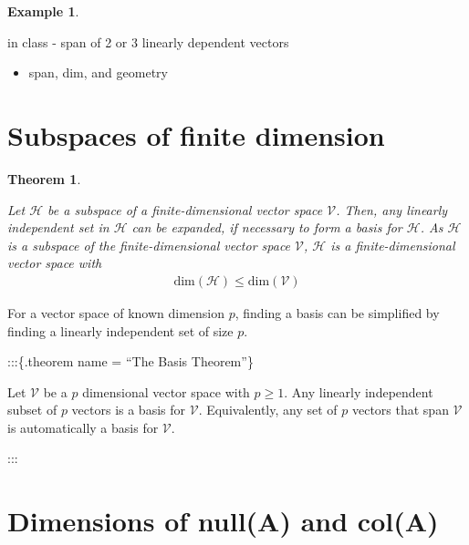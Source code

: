 \documentclass[
]{book}
\providecommand{\tightlist}{%
  \setlength{\itemsep}{0pt}\setlength{\parskip}{0pt}}
\newtheorem{theorem}{Theorem}[chapter]
\theoremstyle{definition}
\theoremstyle{definition}
\newtheorem{example}{Example}[chapter]
\theoremstyle{definition}
\theoremstyle{remark}
\begin{document}
\begin{example}
\protect\hypertarget{exm:unlabeled-div-148}{}\label{exm:unlabeled-div-148}

in class - span of 2 or 3 linearly dependent vectors

\begin{itemize}
\tightlist
\item
  span, dim, and geometry
\end{itemize}

\end{example}

\hypertarget{subspaces-of-finite-dimension}{%
\section{Subspaces of finite dimension}\label{subspaces-of-finite-dimension}}

\begin{theorem}
\protect\hypertarget{thm:unlabeled-div-149}{}\label{thm:unlabeled-div-149}

Let \(\mathcal{H}\) be a subspace of a finite-dimensional vector space \({\mathcal{V}}\). Then, any linearly independent set in \(\mathcal{H}\) can be expanded, if necessary to form a basis for \(\mathcal{H}\). As \(\mathcal{H}\) is a subspace of the finite-dimensional vector space \({\mathcal{V}}\), \(\mathcal{H}\) is a finite-dimensional vector space with
\[
\begin{aligned}
\mbox{dim}(\mathcal{H}) \leq \mbox{dim}(\mathcal{V})
\end{aligned}
\]

\end{theorem}

For a vector space of known dimension \(p\), finding a basis can be simplified by finding a linearly independent set of size \(p\).

:::\{.theorem name = ``The Basis Theorem''\}

Let \(\mathcal{V}\) be a \(p\) dimensional vector space with \(p \geq 1\). Any linearly independent subset of \(p\) vectors is a basis for \(\mathcal{V}\). Equivalently, any set of \(p\) vectors that span \({\mathcal{V}}\) is automatically a basis for \(\mathcal{V}\).

:::

\hypertarget{dimensions-of-nullmathbfa-and-colmathbfa}{%
\section{\texorpdfstring{Dimensions of null(\(\mathbf{A}\)) and col(\(\mathbf{A}\))}{Dimensions of null(\textbackslash mathbf\{A\}) and col(\textbackslash mathbf\{A\})}}\label{dimensions-of-nullmathbfa-and-colmathbfa}}
\end{document}
